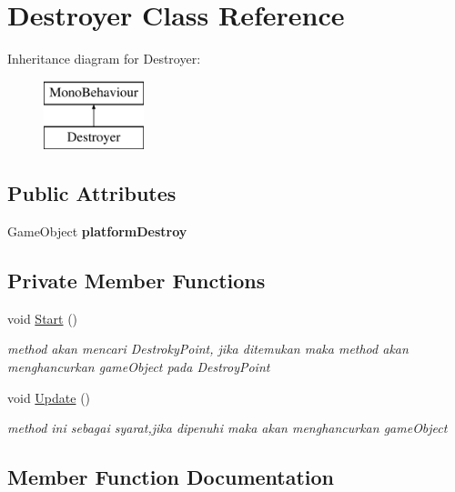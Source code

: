 \hypertarget{class_destroyer}{}\section{Destroyer Class Reference}
\label{class_destroyer}
Inheritance diagram for Destroyer\+:\begin{figure}[H]
\begin{center}
\leavevmode
\includegraphics[height=2.000000cm]{class_destroyer}
\end{center}
\end{figure}
\subsection*{Public Attributes}
\begin{DoxyCompactItemize}
\item 
\hypertarget{class_destroyer_a029b37862396b697d50670319f4a71b9}{}\label{class_destroyer_a029b37862396b697d50670319f4a71b9} 
Game\+Object {\bfseries platform\+Destroy}
\end{DoxyCompactItemize}
\subsection*{Private Member Functions}
\begin{DoxyCompactItemize}
\item 
void \hyperlink{class_destroyer_ae187981d5587502e1e26fe5f0d5bff25}{Start} ()
\begin{DoxyCompactList}\small\item\em method akan mencari Destroky\+Point, jika ditemukan maka method akan menghancurkan game\+Object pada Destroy\+Point \end{DoxyCompactList}\item 
void \hyperlink{class_destroyer_a50232aedbebf94ee992ccb30d891bf64}{Update} ()
\begin{DoxyCompactList}\small\item\em method ini sebagai syarat,jika dipenuhi maka akan menghancurkan game\+Object \end{DoxyCompactList}\end{DoxyCompactItemize}


\subsection{Member Function Documentation}
\hypertarget{class_destroyer_ae187981d5587502e1e26fe5f0d5bff25}{}\label{class_destroyer_ae187981d5587502e1e26fe5f0d5bff25} 
